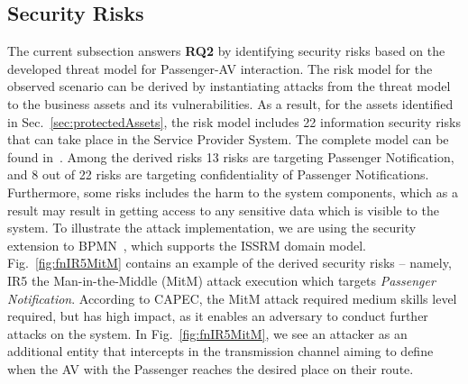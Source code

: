 \documentclass[manuscript]{acmart}
\begin{document}
\subsection{Security Risks} \label{sec:SecRisks}

The current subsection answers \textbf{RQ2} by identifying security risks based on the developed threat model for Passenger-AV interaction.
The risk model for the observed scenario can be derived by instantiating attacks from the threat model to the business assets and its vulnerabilities. As a result, for the assets identified in Sec.~\ref{sec:protectedAssets}, the risk model includes 22 information security risks that can take place in the Service Provider System. The complete model can be found in~\cite{PassengerDataProtection}. Among the derived risks 13 risks are targeting Passenger Notification, and 8 out of 22 risks are targeting confidentiality of Passenger Notifications. Furthermore, some risks includes the harm to the system components, which as a result may result in getting access to any sensitive data which is visible to the system. To illustrate the attack implementation, we are using the security extension to BPMN~\cite{BPMNExt}, which supports the ISSRM domain model. Fig.~\ref{fig:fnIR5MitM} contains an example of the derived security risks -- namely, IR5 the Man-in-the-Middle (MitM) attack execution which targets \textit{Passenger Notification}. According to CAPEC, the MitM attack required medium skills level required, but has high impact, as it enables an adversary to conduct further attacks on the system. In Fig.~\ref{fig:fnIR5MitM}, we see an attacker as an additional entity that intercepts in the transmission channel aiming to define when the AV with the Passenger reaches the desired place on their route.
\end{document}
